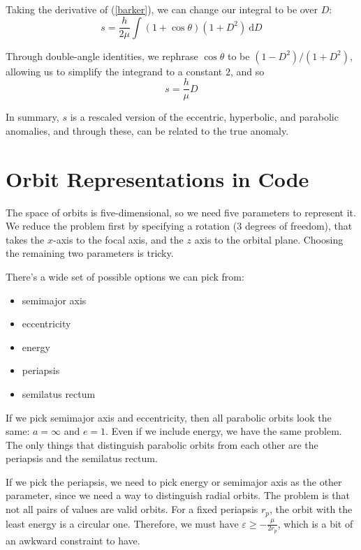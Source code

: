 \documentclass{article}
\newcommand{\dd}{\mathrm{d}}
\numberwithin{equation}{subsection}
\begin{document}
Taking the derivative of (\ref{barker}), we can change our integral to be over $D$:
\begin{equation}
s = \frac{h}{2 \mu} \int (1 + \cos \theta)(1 + D^2)~\dd D
\end{equation}

Through double-angle identities, we rephrase $\cos \theta$ to be $(1 - D^2)/(1 + D^2)$, allowing us to simplify the integrand to a constant $2$, and so
\begin{equation}
\label{parabolic-anomaly}
s = \frac{h}{\mu} D
\end{equation}

In summary, $s$ is a rescaled version of the eccentric, hyperbolic, and parabolic anomalies, and through these, can be related to the true anomaly.



\section{Orbit Representations in Code}

The space of orbits is five-dimensional, so we need five parameters to represent it. We reduce the problem first by specifying a rotation (3 degrees of freedom), that takes the $x$-axis to the focal axis, and the $z$ axis to the orbital plane. Choosing the remaining two parameters is tricky.

There's a wide set of possible options we can pick from:
\begin{itemize}
\item semimajor axis
\item eccentricity
\item energy
\item periapsis
\item semilatus rectum
\end{itemize}

If we pick semimajor axis and eccentricity, then all parabolic orbits look the same: $a = \infty$ and $e = 1$. Even if we include energy, we have the same problem. The only things that distinguish parabolic orbits from each other are the periapsis and the semilatus rectum.

If we pick the periapsis, we need to pick energy or semimajor axis as the other parameter, since we need a way to distinguish radial orbits. The problem is that not all pairs of values are valid orbits. For a fixed periapsis $r_p$, the orbit with the least energy is a circular one. Therefore, we must have $\varepsilon \ge -\frac{\mu}{2r_p}$, which is a bit of an awkward constraint to have.
\end{document}
